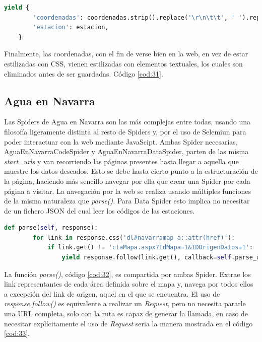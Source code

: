 \begin{lstlisting}[language=Python, caption={Guardado de datos de MeteoNavarra Coordenates Spider}, label=cod:31]
	yield {
		'coordenadas': coordenadas.strip().replace('\r\n\t\t', ' ').replace(' (*)', ''),
		'estacion': estacion,
	}
\end{lstlisting}

Finalmente, las coordenadas, con el fin de verse bien en la web, en vez de estar estilizadas con CSS, vienen estilizadas con elementos textuales, los cuales son eliminados antes de ser guardadas. Código \ref{cod:31}.

\subsection{Agua en Navarra}
Las Spiders de Agua en Navarra son las más complejas entre todas, usando una filosofía ligeramente distinta al resto de Spiders y, por el uso de Selemiun para poder interactuar con la web mediante JavaScipt.\newline
\newline
\label{Chap524}
Ambas Spider necesarias, AguaEnNavarraCodeSpider y AguaEnNavarraDataSpider, parten de las misma \textit{start\_urls} y van recorriendo las páginas presentes hasta llegar a aquella que muestre los datos deseados. Esto se debe hasta cierto punto a la estructuración de la página, haciendo más sencillo navegar por ella que crear una Spider por cada página a visitar. La navegación por la web se realiza usando múltiples funciones de la misma naturaleza que \textit{parse()}.\newline
\newline
Para Data Spider esto implica no necesitar de un fichero JSON del cual leer los códigos de las estaciones.

\begin{lstlisting}[language=Python, caption={Función \textit{parse()} Agua en Navarra Spiders}, label=cod:32]
	def parse(self, response):
		for link in response.css('dl#navarramap a::attr(href)'):
			if link.get() != 'ctaMapa.aspx?IdMapa=1&IDOrigenDatos=1':
				yield response.follow(link.get(), callback=self.parse_area)
\end{lstlisting}

La función \textit{parse()}, código \ref{cod:32}, es compartida por ambas Spider. Extrae los link representantes de cada área definida sobre el mapa y, navega por todos ellos a excepción del link de origen, aquel en el que se encuentra.\newline
\newline
El uso de \textit{response.follow()} es equivalente a realizar un \textit{Request}, pero no necesita pararle una URL completa, solo con la ruta es capaz de generar la llamada, en caso de necesitar explícitamente el uso de \textit{Request} seria la manera mostrada en el código \ref{cod:33}.

